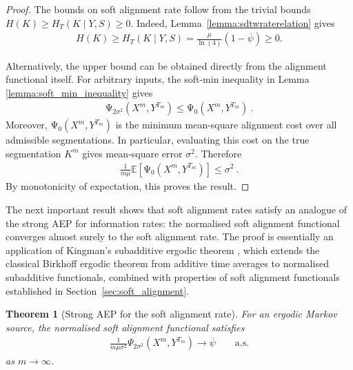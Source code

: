 \documentclass[onecolumn]{IEEEtran}
\newtheorem{theorem}{Theorem}
\theoremstyle{definition}
\begin{document}
\begin{proof}
{The bounds on soft alignment rate follow from the trivial bounds $H(K) \geq H_T(K\mid Y,S)\geq 0$.} Indeed, Lemma~\ref{lemma:sdtwraterelation} gives
\begin{align*}
H(K) \geq H_T(K\mid Y,S)
=
\frac{\mu}{\ln(4)}\left(1-\overline{\psi}\right)
\geq 0.
\end{align*}

Alternatively, the upper bound can be obtained directly from the alignment functional itself. For arbitrary inputs, the soft-min inequality in Lemma \ref{lemma:soft_min_inequality} gives
\begin{align*}
\mathrm{\Psi}_{2\sigma^2}(X^m,Y^{T_m}) \leq \mathrm{\Psi}_{0}(X^m,Y^{T_m})~.
\end{align*}
Moreover, \(\mathrm{\Psi}_{0}(X^m,Y^{T_m})\) is the minimum mean-square alignment cost over all admissible segmentations. In particular, evaluating this cost on the true segmentation \(K^m\) gives mean-square error \(\sigma^2\). Therefore
\begin{align*}
\frac{1}{m\mu}\mathbb{E}\!\left[\mathrm{\Psi}_{0}(X^m,Y^{T_m})\right]\leq \sigma^2~.
\end{align*}
By monotonicity of expectation, this proves the result.
\end{proof}


The next important result shows that soft alignment rates satisfy an analogue of the strong AEP for information rates: the normalised soft alignment functional converges almost surely to the soft alignment rate. The proof is essentially an application of Kingman's subadditive ergodic theorem \cite{Kingman1968}, which extends the classical Birkhoff ergodic theorem from additive time averages to normalised subadditive functionals, combined with properties of soft alignment functionals established in Section~\ref{sec:soft_alignment}.

\begin{theorem}[Strong AEP for the soft alignment rate]
\label{theorem:strongAEP_Psi}
For an ergodic Markov source, the normalised soft alignment functional satisfies
\begin{align}
\frac{1}{m\mu\sigma^2}\Psi_{2\sigma^2}(X^m,Y^{T_m})
\to
\overline{\psi}
\qquad \text{a.s.}
\end{align}
as \(m\to\infty\).
\end{theorem}
\end{document}
